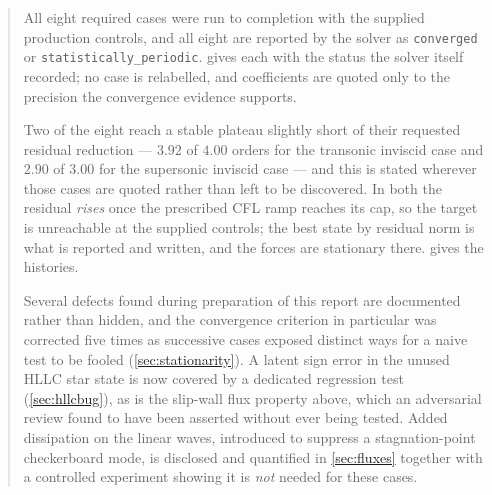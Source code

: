 \documentclass[11pt]{article}
\begin{document}
\begin{abstract}
All eight required cases were run to completion with the supplied production controls,
and all eight are reported by the solver as \texttt{converged} or
\texttt{statistically\_periodic}.  gives each with the status the
solver itself recorded; no case is relabelled, and coefficients are quoted only to the
precision the convergence evidence supports.

Two of the eight reach a stable plateau slightly short of their requested residual
reduction --- $3.92$ of $4.00$ orders for the transonic inviscid case and $2.90$ of $3.00$
for the supersonic inviscid case --- and this is stated wherever those cases are quoted
rather than left to be discovered. In both the residual \emph{rises} once the prescribed
CFL ramp reaches its cap, so the target is unreachable at the supplied controls; the
best state by residual norm is what is reported and written, and the forces are stationary
there.  gives the histories.

Several defects found during preparation of this report are documented rather than
hidden, and the convergence criterion in particular was corrected five times as
successive cases exposed distinct ways for a naive test to be fooled
(\cref{sec:stationarity}). A latent sign error in the unused HLLC star state is now
covered by a dedicated regression test (\cref{sec:hllcbug}), as is the slip-wall flux
property above, which an adversarial review found to have been asserted without ever
being tested. Added dissipation on the linear waves, introduced to suppress a
stagnation-point checkerboard mode, is disclosed and quantified in \cref{sec:fluxes}
together with a controlled experiment showing it is \emph{not} needed for these cases.
\end{abstract}

\tableofcontents
\clearpage













\end{document}

